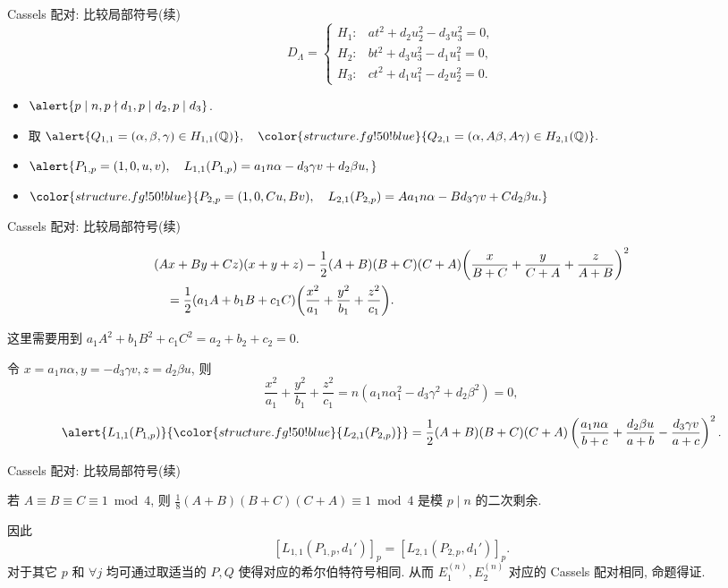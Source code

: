 \documentclass[aspectratio=169]{ctexbeamer}
\renewcommand\emph[1]{{\color{structure.fg!50!blue}{#1}}}
\begin{document}
\begin{frame}{Cassels 配对: 比较局部符号(续)}
\[D_\Lambda=
\begin{cases}
	H_1:& at^2+d_2u_2^2-d_3u_3^2=0,\\
	H_2:& bt^2+d_3u_3^2-d_1u_1^2=0,\\
	H_3:& ct^2+d_1u_1^2-d_2u_2^2=0.
\end{cases}\]
\onslide<+->
\begin{itemize}
\item $\alert{p\mid n,p\nmid d_1,p\mid d_2,p\mid d_3}$.
\item 取 $\alert{Q_{1,1}=(\alpha,\beta,\gamma)\in H_{1,1}(\BQ)},\quad
\emph{Q_{2,1}=(\alpha,A\beta,A\gamma)\in H_{2,1}(\BQ)}.$
\item $\alert{P_{1,p}=(1,0,u,v),\quad
L_{1,1}(P_{1,p})=a_1n\alpha-d_3\gamma v+d_2\beta u,}$
\item $\emph{P_{2,p}=(1,0,Cu,Bv),\quad
L_{2,1}(P_{2,p})=Aa_1n\alpha-Bd_3\gamma v+Cd_2\beta u.}$
\end{itemize}
\end{frame}



\begin{frame}{Cassels 配对: 比较局部符号(续)}
\begin{lemma}
	\[\begin{split}
	&(Ax+By+Cz)(x+y+z)-\frac{1}{2}(A+B)(B+C)(C+A)\biggl(
	\frac x{B+C}+
	\frac y{C+A}+
	\frac z{A+B}\biggr)^2\\
	&\quad=\frac{1}{2}(a_1A+b_1B+c_1C)\biggl(\frac{x^2}{a_1}+\frac{y^2}{b_1}+\frac{z^2}{c_1}\biggr).
	\end{split}\]
\end{lemma}
\onslide<+->
这里需要用到 $a_1A^2+b_1B^2+c_1C^2=a_2+b_2+c_2=0$.

\onslide<+->
令 $x=a_1n\alpha,y=-d_3\gamma v, z=d_2\beta u$, 则
\[\frac{x^2}{a_1}+\frac{y^2}{b_1}+\frac{z^2}{c_1}=n(a_1n\alpha_1^2-d_3\gamma^2+d_2\beta^2)=0,\]
\onslide<+->
\[\alert{L_{1,1}(P_{1,p})}\emph{L_{2,1}(P_{2,p})}=\frac12{(A+B)(B+C)(C+A)}\left(\frac{a_1n\alpha}{b+c}+\frac{d_2\beta u}{a+b}-\frac{d_3\gamma v}{a+c}\right)^2.\]
\end{frame}


\begin{frame}{Cassels 配对: 比较局部符号(续)}
\onslide<+->
\begin{lemma}
若 $A\equiv B\equiv C\equiv 1\bmod 4$, 则 $\frac18(A+B)(B+C)(C+A)\equiv 1\bmod 4$ 是模 $p\mid n$ 的二次剩余.
\end{lemma}
\onslide<+->
因此
\[[L_{1,1}(P_{1,p},d_1')]_p=[L_{2,1}(P_{2,p},d_1')]_p.\]
\onslide<+->
对于其它 $p$ 和 $\forall j$ 均可通过取适当的 $P,Q$ 使得对应的希尔伯特符号相同.
\onslide<+->
从而 $E_1^{(n)},E_2^{(n)}$ 对应的 Cassels 配对相同, 命题得证.
\end{frame}
\end{document}
